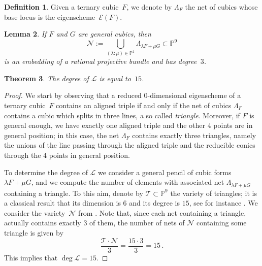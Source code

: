 \documentclass[11pt, a4paper, reqno, captions=tableheading,bibliography=totoc]{scrartcl}
\theoremstyle{plain}
\newtheorem{lemma}{Lemma}[section]
\newtheorem{theorem}[lemma]{Theorem}
\theoremstyle{definition}
\newtheorem{definition}[lemma]{Definition}
\newcommand{\p}{\mathbb{P}}
\newcommand{\Eig}[1]{\mathcal{E}\!\left( {#1} \right)}
\begin{document}
\begin{definition}
 Given a ternary cubic~$F$, we denote by $\Lambda_F$ the net of cubics whose base locus is the eigenscheme~$\Eig{F}$.
\end{definition}

\begin{lemma}
\label{lemma:scroll}
 If $F$ and $G$ are general cubics, then
 \[
   \mathcal{N} := \bigcup_{(\lambda : \mu) \in \p^1} \Lambda_{\lambda F + \mu G} \subset \p^9
 \]
 is an embedding of a rational projective bundle and has degree~$3$.
\end{lemma}

\begin{theorem}
The degree of $\mathcal{L}$ is equal to~$15$.
\end{theorem}
\begin{proof}
We start by observing that a reduced $0$-dimensional eigenscheme of a ternary cubic~$F$ contains an aligned triple if and only if the net of cubics $\Lambda_F$ contains a cubic which splits in three lines, a so called \emph{triangle}. Moreover, if $F$ is general enough, we have exactly one aligned triple and the other $4$ points are in general position; in this case, the net $\Lambda_F$ contains exactly three triangles, namely the unions of the line passing through the aligned triple and the reducible conics through the $4$ points in general position.

To determine the degree of $\mathcal{L}$ we consider a general pencil of cubic forms $\lambda F + \mu G$, and we compute the number of elements with associated net $\Lambda_{\lambda F + \mu G}$ containing a triangle. To this aim, denote by $\mathcal{T} \subset \p^9$ the variety of triangles; it is a classical result that its dimension is $6$ and its degree is $15$, see for instance \cite[Section 2.2.2]{3264}. We consider the variety~$\mathcal{N}$ from .
Note that, since each net containing a triangle, actually contains exactly $3$ of them, the number of nets of $\mathcal{N}$ containing some triangle is given by
%
\[
\frac{\mathcal{T} \cdot {\mathcal N}}{3} = \frac{{15} \cdot {3}}{3} = 15 \,.
\]
%
This implies that $\deg \mathcal{L} = 15$.
\end{proof}




\end{document}
